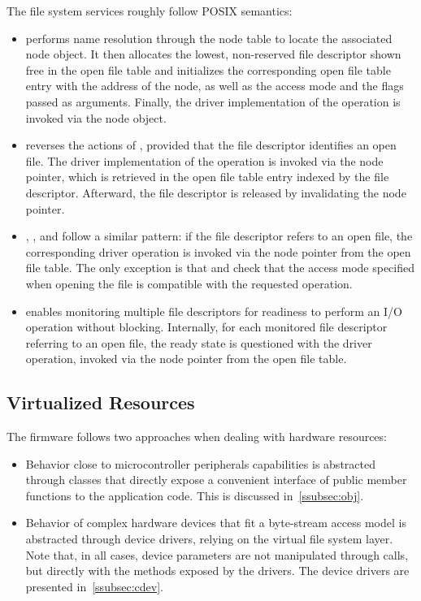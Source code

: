 \begin{description}
    The file system services roughly follow POSIX semantics:
    \begin{itemize}
        \item {} performs name resolution through the node table to locate the associated node object. It then allocates the lowest, non-reserved file descriptor shown free in the open file table and initializes the corresponding open file table entry with the address of the node, as well as the access mode and the flags passed as arguments. Finally, the driver implementation of the operation is invoked via the node object.

        \item {} reverses the actions of , provided that the file descriptor identifies an open file. The driver implementation of the operation is invoked via the node pointer, which is retrieved in the open file table entry indexed by the file descriptor. Afterward, the file descriptor is released by invalidating the node pointer.

        \item {}, , and  follow a similar pattern: if the file descriptor refers to an open file, the corresponding driver operation is invoked via the node pointer from the open file table.
        The only exception is that  and  check that the access mode specified when opening the file is compatible with the requested operation.

        \item {} enables monitoring multiple file descriptors for readiness to perform an I/O operation without blocking.
        Internally, for each monitored file descriptor referring to an open file, the ready state is questioned with the driver  operation, invoked via the node pointer from the open file table.
    \end{itemize}
\end{description}

\subsection{Virtualized Resources}\label{subsec:vdev}

The firmware follows two approaches when dealing with hardware resources:
\begin{itemize}
    \item Behavior close to microcontroller peripherals capabilities is abstracted through \cpp classes that directly expose a convenient interface of public member functions to the application code. This is discussed in~\cref{ssubsec:obj}.
    
    \item Behavior of complex hardware devices that fit a byte-stream access model is abstracted through device drivers, relying on the virtual file system layer.
    Note that, in all cases, device parameters are not manipulated through  calls, but directly with the methods exposed by the drivers.
    The device drivers are presented in~\cref{ssubsec:cdev}.
\end{itemize}

